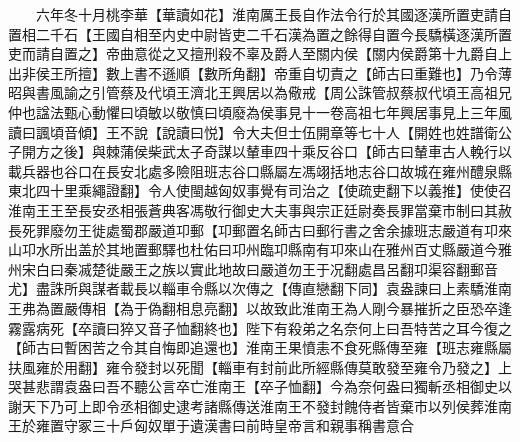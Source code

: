 　　六年冬十月桃李華【華讀如花】淮南厲王長自作法令行於其國逐漢所置吏請自置相二千石【王國自相至内史中尉皆吏二千石漢為置之餘得自置今長驕橫逐漢所置吏而請自置之】帝曲意從之又擅刑殺不辜及爵人至關内侯【關内侯爵第十九爵自上出非侯王所擅】數上書不遜順【數所角翻】帝重自切責之【師古曰重難也】乃令薄昭與書風諭之引管蔡及代頃王濟北王興居以為儆戒【周公誅管叔蔡叔代頃王高祖兄仲也諡法甄心動懼曰頃敏以敬慎曰頃廢為侯事見十一卷高祖七年興居事見上三年風讀曰諷頃音傾】王不說【說讀曰悦】令大夫但士伍開章等七十人【開姓也姓譜衛公子開方之後】與棘蒲侯柴武太子奇謀以輦車四十乘反谷口【師古曰輦車古人輓行以載兵器也谷口在長安北處多險阻班志谷口縣屬左馮翊括地志谷口故城在雍州醴泉縣東北四十里乘繩證翻】令人使閩越匈奴事覺有司治之【使疏吏翻下以義推】使使召淮南王王至長安丞相張蒼典客馮敬行御史大夫事與宗正廷尉奏長罪當棄市制曰其赦長死罪廢勿王徙處蜀郡嚴道卭郵【卭郵置名師古曰郵行書之舍余據班志嚴道有卭來山卭水所出盖於其地置郵驛也杜佑曰卭州臨卭縣南有卭來山在雅州百丈縣嚴道今雅州宋白曰秦㓕楚徙嚴王之族以實此地故曰嚴道勿王于况翻處昌呂翻卭渠容翻郵音尤】盡誅所與謀者載長以輜車令縣以次傳之【傳直戀翻下同】袁盎諫曰上素驕淮南王弗為置嚴傳相【為于偽翻相息亮翻】以故致此淮南王為人剛今暴摧折之臣恐卒逢霧露病死【卒讀曰猝又音子恤翻終也】陛下有殺弟之名奈何上曰吾特苦之耳今復之【師古曰暫困苦之令其自悔即追還也】淮南王果憤恚不食死縣傳至雍【班志雍縣屬扶風雍於用翻】雍令發封以死聞【輜車有封前此所經縣傳莫敢發至雍令乃發之】上哭甚悲謂袁盎曰吾不聽公言卒亡淮南王【卒子恤翻】今為奈何盎曰獨斬丞相御史以謝天下乃可上即令丞相御史逮考諸縣傳送淮南王不發封餽侍者皆棄市以列侯葬淮南王於雍置守冢三十戶匈奴單于遺漢書曰前時皇帝言和親事稱書意合

